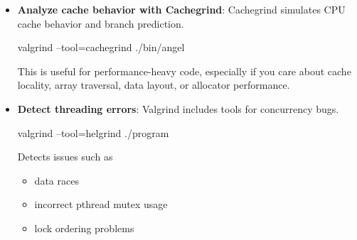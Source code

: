 \documentclass{report}
\begin{document}
\begin{itemize}
\begin{itemize}
\begin{itemize}
                            \item Where is CPU time being spent?
                            \item What call paths are expensive?
                        \end{itemize}
                    \item \textbf{Analyze cache behavior with Cachegrind}: Cachegrind simulates CPU cache behavior and branch prediction.
                        \bigbreak \noindent 
                        \begin{bashcode}
                            valgrind --tool=cachegrind ./bin/angel
                        \end{bashcode}
                        \bigbreak \noindent 
                        This is useful for performance-heavy code, especially if you care about cache locality, array traversal, data layout, or allocator performance.
                    \item \textbf{Detect threading errors}: Valgrind includes tools for concurrency bugs.
                        \bigbreak \noindent 
                        \begin{bashcode}
                        valgrind --tool=helgrind ./program
                        \end{bashcode}
                        \bigbreak \noindent 
                        Detects issues such as 
                        \begin{itemize}
                            \item data races
                            \item incorrect pthread mutex usage
                            \item lock ordering problems
                        \end{itemize}
                \end{itemize}





        \end{itemize}










    
\end{document}
